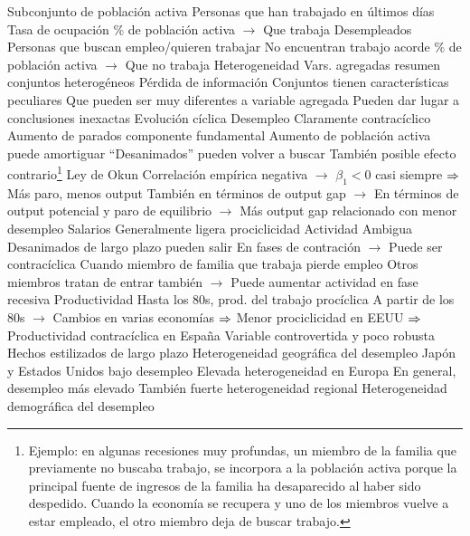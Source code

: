 \documentclass{nuevotema}
\begin{document}
\begin{esquemal}
				\4[] Subconjunto de población activa
				\4[] Personas que han trabajado en últimos días
				\4 Tasa de ocupación
				\4[] \% de población activa
				\4[] $\to$ Que trabaja
				\4 Desempleados
				\4[] Personas que  buscan empleo/quieren trabajar
				\4[] No encuentran trabajo acorde
				\4[] \% de población activa
				\4[] $\to$ Que no trabaja
			\3 Heterogeneidad
				\4 Vars. agregadas resumen conjuntos heterogéneos
				\4[] Pérdida de información
				\4 Conjuntos tienen características peculiares
				\4[] Que pueden ser muy diferentes a variable agregada
				\4[] Pueden dar lugar a conclusiones inexactas
		\2 Evolución cíclica
			\3 Desempleo
				\4 Claramente contracíclico
				\4 Aumento de parados componente fundamental
				\4 Aumento de población activa puede amortiguar
				\4[] ``Desanimados'' pueden volver a buscar
				\4[] También posible efecto contrario\footnote{Ejemplo: en algunas recesiones muy profundas, un miembro de la familia que previamente no buscaba trabajo, se incorpora a la población activa porque la principal fuente de ingresos de la familia ha desaparecido al haber sido despedido. Cuando la economía se recupera y uno de los miembros vuelve a estar empleado, el otro miembro deja de buscar trabajo.}
				\4 Ley de Okun
				\4[] Correlación empírica negativa
				\4[] 
				\4[] $\to$ $\beta_1 < 0$ casi siempre
				\4[] $\then$ Más paro, menos output
				\4[] También en términos de output gap
				\4[] $\to$ En términos de output potencial y paro de equilibrio
				\4[] $\to$ Más output gap relacionado con menor desempleo
			\3 Salarios
				\4 Generalmente ligera prociclicidad
			\3 Actividad
				\4 Ambigua
				\4 Desanimados de largo plazo pueden salir
				\4[] En fases de contración
				\4[] $\to$ Puede ser contracíclica
				\4 Cuando miembro de familia que trabaja pierde empleo
				\4[] Otros miembros tratan de entrar también
				\4[] $\to$ Puede aumentar actividad en fase recesiva
			\3 Productividad
				\4 Hasta los 80s, prod. del trabajo procíclica
				\4 A partir de los 80s
				\4[] $\to$ Cambios en varias economías
				\4[] $\then$ Menor prociclicidad en EEUU
				\4[] $\then$ Productividad contracíclica en España
				\4[$\then$] Variable controvertida y poco robusta
		\2 Hechos estilizados de largo plazo
			\3 Heterogeneidad geográfica del desempleo
				\4 Japón y Estados Unidos bajo desempleo
				\4 Elevada heterogeneidad en Europa
				\4[] En general, desempleo más elevado
				\4 También fuerte heterogeneidad regional
			\3 Heterogeneidad demográfica del desempleo

\end{esquemal}
\end{document}
